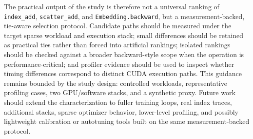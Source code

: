 The practical output of the study is therefore not a universal ranking of \texttt{index\_\allowbreak add}, \texttt{scatter\_\allowbreak add}, and \texttt{Embedding.\allowbreak backward}, but a measurement-backed, tie-aware selection protocol. Candidate paths should be measured under the target sparse workload and execution stack; small differences should be retained as practical ties rather than forced into artificial rankings; isolated rankings should be checked against a broader backward-style scope when the operation is performance-critical; and profiler evidence should be used to inspect whether timing differences correspond to distinct CUDA execution paths. This guidance remains bounded by the study design: controlled workloads, representative profiling cases, two GPU/software stacks, and a synthetic proxy. Future work should extend the characterization to fuller training loops, real index traces, additional stacks, sparse optimizer behavior, lower-level profiling, and possibly lightweight calibration or autotuning tools built on the same measurement-backed protocol.